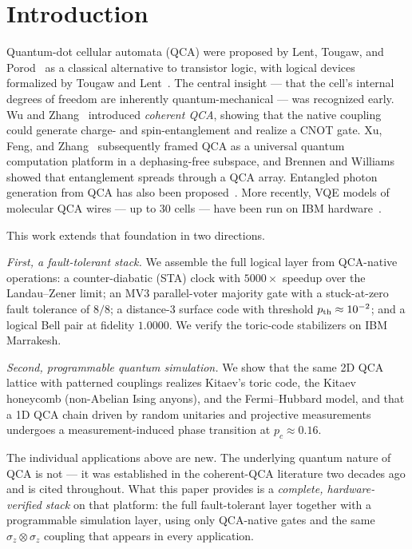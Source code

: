 \section{Introduction}

Quantum-dot cellular automata (QCA) were proposed by Lent, Tougaw,
and Porod~\cite{lent1993qca} as a classical alternative to
transistor logic, with logical devices formalized by Tougaw and
Lent~\cite{tougaw1994logical}.  The central insight --- that the
cell's internal degrees of freedom are inherently
quantum-mechanical --- was recognized early.  Wu and
Zhang~\cite{wu2005coherent} introduced \emph{coherent QCA},
showing that the native coupling could generate charge- and
spin-entanglement and realize a CNOT gate.  Xu, Feng, and
Zhang~\cite{xu2008universal} subsequently framed QCA as a
universal quantum computation platform in a dephasing-free
subspace, and Brennen and Williams~\cite{brennen2003entanglement}
showed that entanglement spreads through a QCA array.  Entangled
photon generation from QCA has also been
proposed~\cite{feng2007entangled}.  More recently, VQE models of
molecular QCA wires --- up to 30 cells --- have been run on IBM
hardware~\cite{jap2026vqe}.

This work extends that foundation in two directions.

\emph{First, a fault-tolerant stack.}  We assemble the full
logical layer from QCA-native operations: a counter-diabatic
(STA) clock with $5000\times$ speedup over the Landau--Zener
limit; an MV3 parallel-voter majority gate with a stuck-at-zero
fault tolerance of $8/8$; a distance-3 surface code with threshold
$p_{\rm th} \approx 10^{-2}$; and a logical Bell pair at fidelity
$1.0000$.  We verify the toric-code stabilizers on IBM Marrakesh.

\emph{Second, programmable quantum simulation.}  We show that the
same 2D QCA lattice with patterned couplings realizes Kitaev's
toric code, the Kitaev honeycomb (non-Abelian Ising anyons),
and the Fermi--Hubbard model, and that a 1D QCA chain driven by
random unitaries and projective measurements undergoes a
measurement-induced phase transition at $p_c \approx 0.16$.

The individual applications above are new.  The underlying
quantum nature of QCA is not --- it was established in the
coherent-QCA literature two decades ago and is cited throughout.
What this paper provides is a \emph{complete, hardware-verified
stack} on that platform: the full fault-tolerant layer together
with a programmable simulation layer, using only QCA-native gates
and the same $\sigma_z \otimes \sigma_z$ coupling that appears in
every application.
